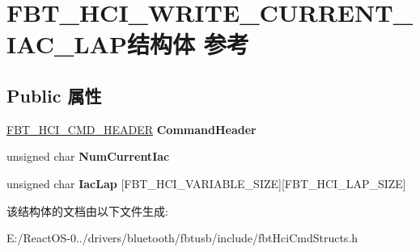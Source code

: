 \hypertarget{struct_f_b_t___h_c_i___w_r_i_t_e___c_u_r_r_e_n_t___i_a_c___l_a_p}{}\section{F\+B\+T\+\_\+\+H\+C\+I\+\_\+\+W\+R\+I\+T\+E\+\_\+\+C\+U\+R\+R\+E\+N\+T\+\_\+\+I\+A\+C\+\_\+\+L\+A\+P结构体 参考}
\label{struct_f_b_t___h_c_i___w_r_i_t_e___c_u_r_r_e_n_t___i_a_c___l_a_p}
\subsection*{Public 属性}
\begin{DoxyCompactItemize}
\item 
\mbox{\label{struct_f_b_t___h_c_i___w_r_i_t_e___c_u_r_r_e_n_t___i_a_c___l_a_p_aca314a25cf6423743382565ee49669a1}} 
\hyperlink{struct_f_b_t___h_c_i___c_m_d___h_e_a_d_e_r}{F\+B\+T\+\_\+\+H\+C\+I\+\_\+\+C\+M\+D\+\_\+\+H\+E\+A\+D\+ER} {\bfseries Command\+Header}
\item 
\mbox{\label{struct_f_b_t___h_c_i___w_r_i_t_e___c_u_r_r_e_n_t___i_a_c___l_a_p_a46e624aac18fa65d9da2262dd3cffe91}} 
unsigned char {\bfseries Num\+Current\+Iac}
\item 
\mbox{\label{struct_f_b_t___h_c_i___w_r_i_t_e___c_u_r_r_e_n_t___i_a_c___l_a_p_a92b85ec98c84a1f93a174a51316cb198}} 
unsigned char {\bfseries Iac\+Lap} \mbox{[}F\+B\+T\+\_\+\+H\+C\+I\+\_\+\+V\+A\+R\+I\+A\+B\+L\+E\+\_\+\+S\+I\+ZE\mbox{]}\mbox{[}F\+B\+T\+\_\+\+H\+C\+I\+\_\+\+L\+A\+P\+\_\+\+S\+I\+ZE\mbox{]}
\end{DoxyCompactItemize}


该结构体的文档由以下文件生成\+:\begin{DoxyCompactItemize}
\item 
E\+:/\+React\+O\+S-\/0../drivers/bluetooth/fbtusb/include/fbt\+Hci\+Cmd\+Structs.\+h\end{DoxyCompactItemize}

